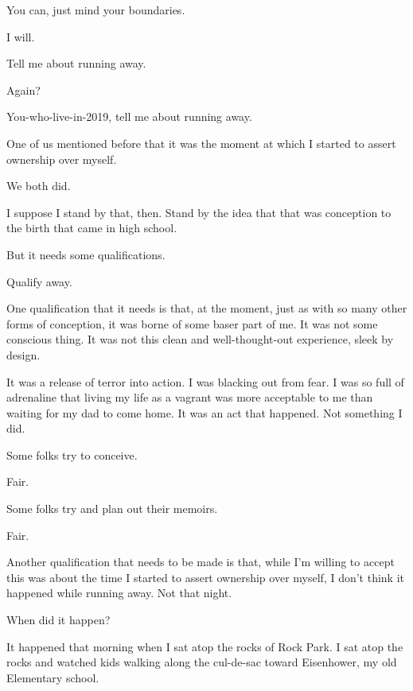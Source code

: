 \begin{paracol}{2}
\begin{leftcolumn}
\begin{ally}
You can, just mind your boundaries.
\end{ally}
I will.

\begin{ally}
Tell me about running away.
\end{ally}
Again?

\begin{ally}
You-who-live-in-2019, tell me about running away.
\end{ally}
One of us mentioned before that it was the moment at which I started to assert ownership over myself.

\begin{ally}
We both did.
\end{ally}
I suppose I stand by that, then. Stand by the idea that that was conception to the birth that came in high school.

But it needs some qualifications.

\begin{ally}
Qualify away.
\end{ally}
One qualification that it needs is that, at the moment, just as with so many other forms of conception, it was borne of some baser part of me. It was not some conscious thing. It was not this clean and well-thought-out experience, sleek by design.

It was a release of terror into action. I was blacking out from fear. I was so full of adrenaline that living my life as a vagrant was more acceptable to me than waiting for my dad to come home. It was an act that happened. Not something I did.

\begin{ally}
Some folks try to conceive.
\end{ally}
Fair.

Some folks try and plan out their memoirs.

\begin{ally}
Fair.
\end{ally}
Another qualification that needs to be made is that, while I'm willing to accept this was about the time I started to assert ownership over myself, I don't think it happened while running away. Not that night.

\begin{ally}
When did it happen?
\end{ally}
It happened that morning when I sat atop the rocks of Rock Park. I sat atop the rocks and watched kids walking along the cul-de-sac toward Eisenhower, my old Elementary school.


\end{leftcolumn}
\end{paracol}
